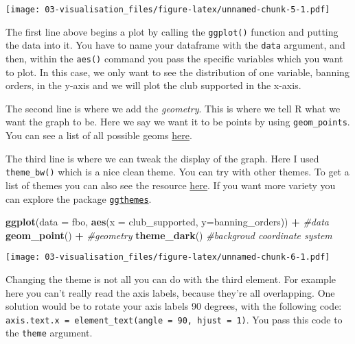 \documentclass[
]{book}
\newenvironment{Shaded}{\begin{snugshade}}{\end{snugshade}}
\newcommand{\AttributeTok}[1]{\textcolor[rgb]{0.13,0.29,0.53}{#1}}
\newcommand{\CommentTok}[1]{\textcolor[rgb]{0.56,0.35,0.01}{\textit{#1}}}
\newcommand{\FunctionTok}[1]{\textcolor[rgb]{0.13,0.29,0.53}{\textbf{#1}}}
\newcommand{\NormalTok}[1]{#1}
\newcommand{\SpecialCharTok}[1]{\textcolor[rgb]{0.81,0.36,0.00}{\textbf{#1}}}
\begin{document}
\texttt{[image: 03-visualisation\_files/figure-latex/unnamed-chunk-5-1.pdf]}

The first line above begins a plot by calling the \texttt{ggplot()} function and putting the data into it. You have to name your dataframe with the \texttt{data} argument, and then, within the \texttt{aes()} command you pass the specific variables which you want to plot. In this case, we only want to see the distribution of one variable, banning orders, in the y-axis and we will plot the club supported in the x-axis.

The second line is where we add the \emph{geometry}. This is where we tell R what we want the graph to be. Here we say we want it to be points by using \texttt{geom\_points}. You can see a list of all possible geoms \href{https://ggplot2.tidyverse.org/reference/}{here}.

The third line is where we can tweak the display of the graph. Here I used \texttt{theme\_bw()} which is a nice clean theme. You can try with other themes. To get a list of themes you can also see the resource \href{https://ggplot2.tidyverse.org/reference/ggtheme.html}{here}. If you want more variety you can explore the package \href{https://yutannihilation.github.io/allYourFigureAreBelongToUs/ggthemes/}{\texttt{ggthemes}}.

\begin{Shaded}
\begin{Highlighting}[]
\FunctionTok{ggplot}\NormalTok{(}\AttributeTok{data =}\NormalTok{ fbo, }\FunctionTok{aes}\NormalTok{(}\AttributeTok{x =}\NormalTok{ club\_supported, }\AttributeTok{y=}\NormalTok{banning\_orders)) }\SpecialCharTok{+}     \CommentTok{\#data}
   \FunctionTok{geom\_point}\NormalTok{() }\SpecialCharTok{+}                                                   \CommentTok{\#geometry}
  \FunctionTok{theme\_dark}\NormalTok{()                                                      }\CommentTok{\#backgroud coordinate system}
\end{Highlighting}
\end{Shaded}

\texttt{[image: 03-visualisation\_files/figure-latex/unnamed-chunk-6-1.pdf]}

Changing the theme is not all you can do with the third element. For example here you can't really read the axis labels, because they're all overlapping. One solution would be to rotate your axis labels 90 degrees, with the following code: \texttt{axis.text.x\ =\ element\_text(angle\ =\ 90,\ hjust\ =\ 1)}. You pass this code to the \texttt{theme} argument.
\end{document}
